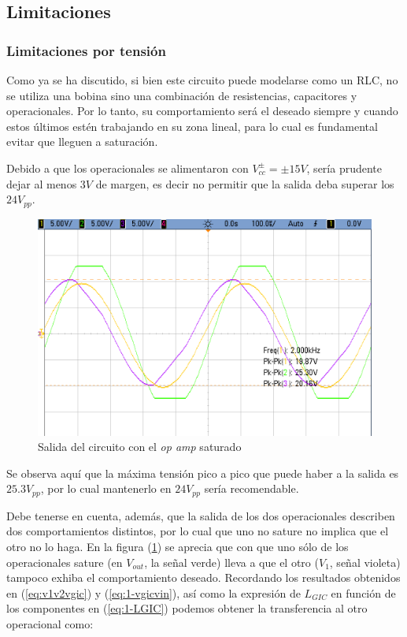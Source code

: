 \documentclass[../../tc_tp3_main.tex]{subfiles}
\begin{document}
\subsection{Limitaciones}

\subsubsection{Limitaciones por tensi\'on}

Como ya se ha discutido, si bien este circuito puede modelarse como un RLC, no se utiliza una bobina sino una combinaci\'on de resistencias, capacitores y operacionales. Por lo tanto, su comportamiento ser\'a el deseado siempre y cuando estos \'ultimos est\'en trabajando en su zona lineal, para lo cual es fundamental evitar que lleguen a saturaci\'on. \par

Debido a que los operacionales se alimentaron con $V_{cc}^\pm = \pm 15V$, ser\'ia prudente dejar al menos $3V$ de margen, es decir no permitir que la salida deba superar los $24V_{pp}$. 

\begin{figure}[H]
	\centering
  	\includegraphics[scale = 0.3]{imagenes/tc_tp3_ej1_saturacion.png}
  	\caption{Salida del circuito con el \textit{op amp} saturado}
  	\label{fig:1-saturacion}
\end{figure}

Se observa aqu\'i que la m\'axima tensi\'on pico a pico que puede haber a la salida es $25.3V_{pp}$, por lo cual mantenerlo en $24V_{pp}$ ser\'ia recomendable.\par

Debe tenerse en cuenta, adem\'as, que la salida de los dos operacionales describen dos comportamientos distintos, por lo cual que uno no sature no implica que el otro no lo haga. En la figura (\ref{fig:1-saturacion}) se aprecia que con que uno s\'olo de los operacionales sature (en $V_{out}$, la se\~nal verde) lleva a que el otro ($V_1$, se\~nal violeta) tampoco exhiba el comportamiento deseado. Recordando los resultados obtenidos en (\ref{eq:v1v2vgic}) y (\ref{eq:1-vgicvin}), as\'i como la expresi\'on de $L_{GIC} $ en funci\'on de los componentes en (\ref{eq:1-LGIC}) podemos obtener la transferencia al otro operacional como:
\end{document}
